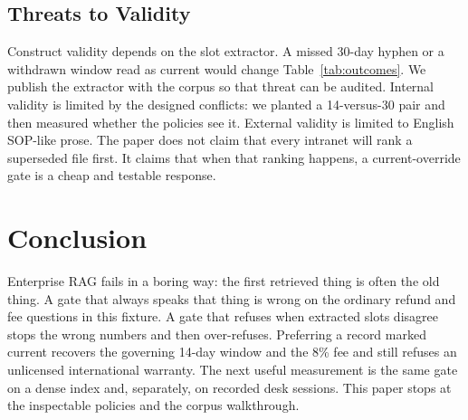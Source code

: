 \documentclass{icaiit2027}
\begin{document}
\subsection{Threats to Validity}

Construct validity depends on the slot extractor. A missed 30-day hyphen or a withdrawn window read as current would change Table~\ref{tab:outcomes}. We publish the extractor with the corpus so that threat can be audited. Internal validity is limited by the designed conflicts: we planted a 14-versus-30 pair and then measured whether the policies see it. External validity is limited to English SOP-like prose. The paper does not claim that every intranet will rank a superseded file first. It claims that when that ranking happens, a current-override gate is a cheap and testable response.

\section{Conclusion}

Enterprise RAG fails in a boring way: the first retrieved thing is often the old thing. A gate that always speaks that thing is wrong on the ordinary refund and fee questions in this fixture. A gate that refuses when extracted slots disagree stops the wrong numbers and then over-refuses. Preferring a record marked current recovers the governing 14-day window and the 8\% fee and still refuses an unlicensed international warranty. The next useful measurement is the same gate on a dense index and, separately, on recorded desk sessions. This paper stops at the inspectable policies and the corpus walkthrough.


\end{document}
